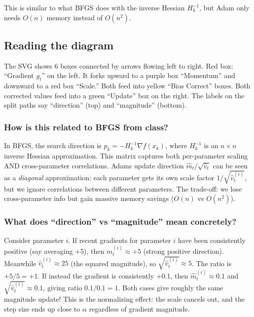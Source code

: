\documentclass[11pt, letterpaper]{article}
\begin{document}
This is similar to what BFGS does with the inverse Hessian $H_k^{-1}$, but Adam only needs $O(n)$ memory instead of $O(n^2)$.

\subsection{Reading the diagram}
The SVG shows 6 boxes connected by arrows flowing left to right. Red box: ``Gradient $g_t$'' on the left. It forks upward to a purple box ``Momentum'' and downward to a red box ``Scale.'' Both feed into yellow ``Bias Correct'' boxes. Both corrected values feed into a green ``Update'' box on the right. The labels on the split paths say ``direction'' (top) and ``magnitude'' (bottom).

\begin{deepdive}
\subsubsection{How is this related to BFGS from class?}
In BFGS, the search direction is $p_k = -H_k^{-1} \nabla f(x_k)$, where $H_k^{-1}$ is an $n \times n$ inverse Hessian approximation. This matrix captures both per-parameter scaling AND cross-parameter correlations. Adams update direction $\hat{m}_t / \sqrt{\hat{v}_t}$ can be seen as a \textit{diagonal} approximation: each parameter gets its own scale factor $1/\sqrt{\hat{v}_t^{(i)}}$, but we ignore correlations between different parameters. The trade-off: we lose cross-parameter info but gain massive memory savings ($O(n)$ vs $O(n^2)$).

\subsubsection{What does ``direction'' vs ``magnitude'' mean concretely?}
Consider parameter $i$. If recent gradients for parameter $i$ have been consistently positive (say averaging +5), then $\hat{m}_t^{(i)} \approx +5$ (strong positive direction). Meanwhile $\hat{v}_t^{(i)} \approx 25$ (the squared magnitude), so $\sqrt{\hat{v}_t^{(i)}} \approx 5$. The ratio is $+5/5 = +1$. If instead the gradient is consistently +0.1, then $\hat{m}_t^{(i)} \approx 0.1$ and $\sqrt{\hat{v}_t^{(i)}} \approx 0.1$, giving ratio $0.1/0.1 = 1$. Both cases give roughly the same magnitude update! This is the normalizing effect: the scale cancels out, and the step size ends up close to $\alpha$ regardless of gradient magnitude.
\end{deepdive}
\end{document}

